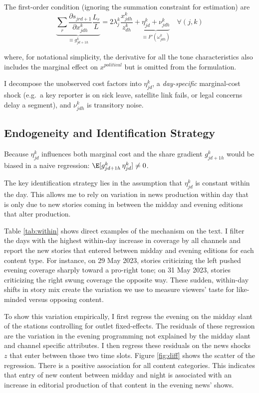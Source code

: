 \documentclass[12pt]{article}
\begin{document}
The first-order condition (ignoring the summation constraint for estimation) are
\begin{equation}\label{eq:focs}
	\underbrace{\sum_{r}\frac{\partial s_{jrd+1}}{\partial x_{jdh}^k}\frac{L_r}{L}}_{\equiv g_{jd+1h}^k}=	2\lambda_j^k\frac{x_{jdh}^k}{z_{dh}^k}  +\underbrace{	\eta_{jd}^k+\nu_{jdh}^k}_{\equiv F'(\omega_{jdh}^k)}  \quad \forall(j,k)
\end{equation}


where, for notational simplicity, the derivative for all the tone characteristics also includes the marginal effect on $x^{political}$ but is omitted from the formulation. 

I decompose the unobserved cost factors into 
$\eta_{jd}^k$, a \emph{ day-specific} marginal-cost shock
(e.g.\ a key reporter is on sick leave, satellite link fails, or legal concerns delay a segment),
and $\nu_{jdh}^k$ is transitory noise. 


\subsection{Endogeneity and Identification Strategy}


Because $\eta_{jd}^k$ influences both marginal cost and the share gradient
$g_{jd+1h}^k$ would be biased in a naive regression: $\E[g_{jd+1h}^k\,\eta_{jd}^k]\neq0$.


The key identification strategy lies in the assumption that $\eta_{jd}^k$ is constant within the day. This allows me to rely on variation in news production within day that is only due to new stories coming in between the midday and evening editions that alter production.  

Table \ref{tab:within} shows direct examples of the mechanism on the text. I filter the days with the highest within-day increase in coverage by all channels and report the new stories that entered between midday and evening editions for each content type. For instance, on 29 May 2023, stories criticizing the left pushed evening coverage sharply toward a pro-right tone; on 31 May 2023, stories criticizing the right swung coverage the opposite way. These sudden, within-day shifts in story mix create the variation we use to measure viewers’ taste for like-minded versus opposing content.


To show this variation empirically, I first regress the evening on the midday slant of the stations controlling for outlet fixed-effects. The residuals of these regression are the  variation in the evening programming not explained by the midday slant and channel specific attributes. I then regress these residuals on the news shocks $z$ that enter between those two time slots. Figure \ref{fig:diff} shows the scatter of the regression.  There is a positive association for all content categories. This indicates that entry of new content between midday and night is associated with an increase in editorial production of that content in the evening news' shows. 
\end{document}
